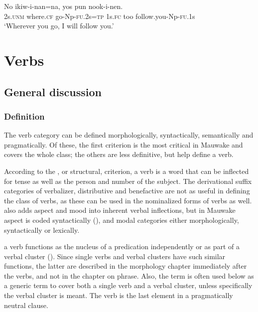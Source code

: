 \ea%
\label{ex:3:x1869}
\gll No  ikiw-i-nan=na, yos pun nook-i-nen. \\
2s.\textsc{unm} where.\textsc{cf} go-Np-\textsc{fu}.2s=\textsc{tp} 1s.\textsc{fc} too follow.you-Np-\textsc{fu}.1s\\
\glt`Wherever you go, I will follow you.'
\z

\section{Verbs}\label{sec:3:8}
{}
\subsection{General discussion}
{}
\subsubsection{Definition}
{}
The verb category can be defined morphologically, syntactically, semantically and pragmatically. Of these, the first criterion is the most critical in Mauwake and covers the whole class; the others are less definitive, but help define a  verb.

According to the , or structural, criterion, a verb is a word that can be inflected for tense as well as the person and number of the subject. The derivational suffix categories of verbalizer, distributive and benefactive are not as useful in defining the class of verbs, as these can be used in the nominalized forms of verbs as well. \citet[190]{Anderson1985b} also adds aspect and mood into inherent verbal inflections, but in Mauwake aspect is coded syntactically (), and modal categories either morphologically, syntactically or lexically.

 a verb functions as the nucleus of a predication independently or as part of a verbal cluster (). Since single verbs and verbal clusters have such similar functions, the latter are described in the morphology chapter immediately after the verbs, and not in the chapter on phrase. Also, the term  is often used below as a generic term to cover both a single verb and a verbal cluster, unless specifically the verbal cluster is meant. The verb is the last element in a pragmatically neutral clause.


